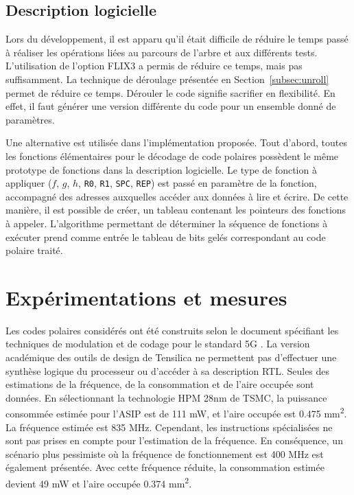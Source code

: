 \subsection{Description logicielle}
Lors du développement, il est apparu qu'il était difficile de réduire le temps passé à réaliser les opérations liées au parcours de l'arbre et aux différents tests. L'utilisation de l'option FLIX3 a permis de réduire ce temps, mais pas suffisamment. La technique de déroulage présentée en Section~\ref{subsec:unroll} permet de réduire ce temps. Dérouler le code signifie sacrifier en flexibilité. En effet, il faut générer une version différente du code pour un ensemble donné de paramètres.

Une alternative est utilisée dans l'implémentation proposée. Tout d'abord, toutes les fonctions élémentaires pour le décodage de code polaires possèdent le même prototype de fonctions dans la description logicielle. Le type de fonction à appliquer ($f$, $g$, $h$, \texttt{R0}, \texttt{R1}, \texttt{SPC}, \texttt{REP}) est passé en paramètre de la fonction, accompagné des adresses auxquelles accéder aux données à lire et écrire. De cette manière, il est possible de créer, un tableau contenant les pointeurs des fonctions à appeler. L'algorithme permettant de déterminer la séquence de fonctions à exécuter prend comme entrée le tableau de bits gelés correspondant au code polaire traité.

\section{Expérimentations et mesures}
\label{sec:tensilica_res}


Les codes polaires considérés ont été construits selon le document spécifiant les techniques de modulation et de codage pour le standard 5G \cite{}. 
La version académique des outils de design de Tensilica ne permettent pas d'effectuer une synthèse logique du processeur ou d'accéder à sa description RTL. Seules des estimations de la fréquence, de la consommation et de l'aire occupée sont données. En sélectionnant la technologie HPM 28nm de TSMC, la puissance consommée estimée pour l'ASIP est de 111 mW, et l'aire occupée est 0.475 mm\textsuperscript{2}. La fréquence estimée est 835 MHz. Cependant, les instructions spécialisées ne sont pas prises en compte pour l'estimation de la fréquence. En conséquence, un scénario plus pessimiste où la fréquence de fonctionnement est 400 MHz est également présentée. Avec cette fréquence réduite, la consommation estimée devient 49 mW et l'aire occupée 0.374 mm\textsuperscript{2}.

